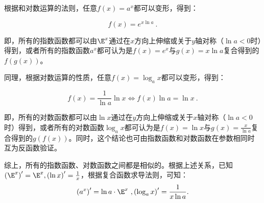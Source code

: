 根据和对数运算的法则，任意$f(x)=a^x$都可以变形，得到：

\begin{equation}
f(x)=e^{x\ln a}~.
\end{equation}

即，所有的指数函数都可以由$\E^x$通过在$x$方向上伸缩或关于$y$轴对称（$\ln a<0$时）得到，或者所有的指数函数$a^x$都可认为是$f(x)=e^x$与$g(x)=x\ln a$复合得到的$f(g(x))$。

同理，根据对数运算的性质，任意$f(x)=\log_ax$都可以变形，得到：

\begin{equation}
f(x)=\frac{1}{\ln a}\ln x\iff f(x)\ln a=\ln x~.
\end{equation}

即，所有的对数函数都可以由$\ln x$通过在$y$方向上伸缩或关于$x$轴对称（$\ln a<0$时）得到，或者所有的对数函数$\log_ax$都可认为是$f(x)=\ln x$与$\displaystyle g(x)=\frac{x}{\ln a}$复合得到的$g(f(x))$。同时，这个结论也可由指数函数和对数函数在参数相同时互为反函数验证。

综上，所有的指数函数、对数函数之间都是相似的。根据上述关系，已知$\left(\E^x\right)'=\E^x,\left(\ln x\right)'=\frac{1}{x}$，根据复合函数求导法则，可知：
\begin{equation}
\left(a^x\right)'=\ln a\cdot\E^x~,\left(\log_a x\right)'=\frac{1}{x\ln a}.
\end{equation}
